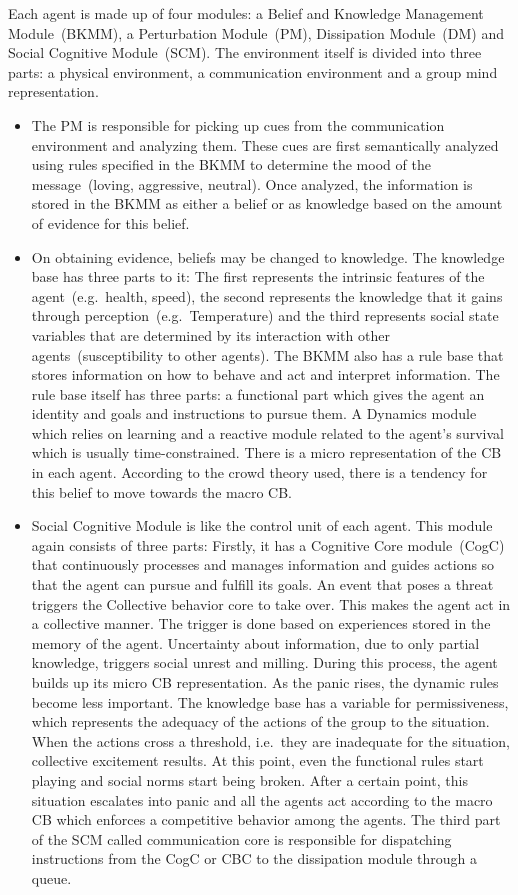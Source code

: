 Each agent is made up of four modules: a Belief and Knowledge Management Module~(BKMM), a Perturbation Module~(PM), Dissipation Module~(DM) and Social Cognitive Module~(SCM). The environment itself is divided into three parts: a physical environment, a communication environment and a group mind representation.
\begin{itemize}
\item
The PM is responsible for picking up cues from the communication environment and analyzing them. These cues are first semantically analyzed using rules specified in the BKMM to determine the mood of the message~(loving, aggressive, neutral). Once analyzed, the information is stored in the BKMM as either a belief or as knowledge based on the amount of evidence for this belief.
\item
On obtaining evidence, beliefs may be changed to knowledge. The knowledge base has three parts to it: The first represents the intrinsic features of the agent~(e.g.\ health, speed), the second represents the knowledge that it gains through perception~(e.g.\ Temperature) and the third represents social state variables that are determined by its interaction with other agents~(susceptibility to other agents). The BKMM also has a rule base that stores information on how to behave and act and interpret information. The rule base itself has three parts: a functional part which gives the agent an identity and goals and instructions to pursue them. A Dynamics module which relies on learning and a reactive module related to the agent's survival which is usually time-constrained. There is a micro representation of the CB in each agent. According to the crowd theory used, there is a tendency for this belief to move towards the macro CB.
\item
Social Cognitive Module is like the control unit of each agent. This module again consists of three parts: Firstly, it has a Cognitive Core module~(CogC) that continuously processes and manages information and guides actions so that the agent can pursue and fulfill its goals. An event that poses a threat triggers the Collective behavior core to take over. This makes the agent act in a collective manner. The trigger is done based on experiences stored in the memory of the agent. Uncertainty about information, due to only partial knowledge, triggers social unrest and milling. During this process, the agent builds up its micro CB representation. As the panic rises, the dynamic rules become less important. The knowledge base has a variable for permissiveness, which represents the adequacy of the actions of the group to the situation. When the actions cross a threshold, i.e.\ they are inadequate for the situation, collective excitement results. At this point, even the functional rules start playing and social norms start being broken. After a certain point, this situation escalates into panic and all the agents act according to the macro CB which enforces a competitive behavior among the agents. The third part of the SCM called communication core is responsible for dispatching instructions from the CogC or CBC to the dissipation module through a queue.

\end{itemize}
